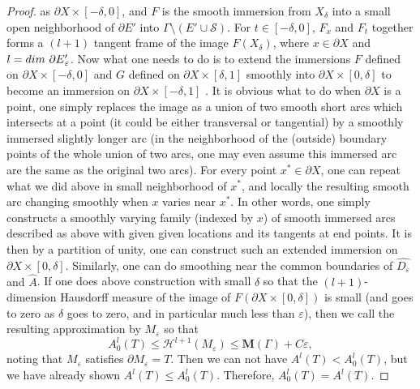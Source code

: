 \documentclass[10pt,a4paper]{amsart}
\begin{document}
\begin{proof}
as $\partial X \times [-\delta, 0]$, and  $F$ is the smooth immersion from $X_{\delta}$  into a small open neighborhood of
$\partial E'$ into $\Gamma \setminus (E'\cup \mathcal{S}).$  For $t \in [-\delta, 0]$, 
$F_{x}$  and $F_t$ together forms a $(l+1)$ tangent frame of the image $F(X_{\delta})$, where $x \in  \partial X$
and  $l = {\rm{dim}} \ \partial E{_\varepsilon'}$.  Now what one needs to do is to extend the immersions $F$ defined on  $\partial X \times [-\delta, 0]$ and $G$ defined on $\partial X \times [\delta, 1]$ smoothly into  $\partial X \times [0, \delta]$ to become an immersion on   $\partial X \times [-\delta, 1]$ .  It is obvious what to do when $\partial X $ is a point, one simply replaces the image as a union of two smooth short arcs which intersects at a point (it could be either transversal or tangential) by a smoothly immersed slightly longer arc (in the neighborhood of the (outside) boundary points of the whole union of two arcs, one may even assume this
immersed arc are the same as the original two arcs).  For every point $x^* \in  \partial X$, one can 
{repeat what we did above}  in small neighborhood of $x^*$, and locally the resulting smooth arc changing smoothly  
when $x$ varies near $x^*$. In other words, one simply constructs a smoothly varying family (indexed by $x$) of smooth immersed arcs described as above with given given locations and its tangents at end points.  It is then by a partition of unity, one can construct such an extended  immersion on  
$\partial X \times [0, \delta]$. Similarly, one can do  smoothing near the common boundaries of {$\widehat{D_\varepsilon}$ and $\widehat{A}$}. If one does above construction with small $\delta$ so that the $(l+1)$-dimension Hausdorff measure of the image of $F (\partial X \times [0, \delta])$ is small 
(and goes to zero as $\delta$ goes to zero, and in particular much less than $\varepsilon$), then
we call the resulting approximation by $M_\varepsilon$ so that
\[ A^l_0(T) \leq \mathcal{H}^{l+1}(M_\varepsilon) \leq \mathbf{M}(\Gamma) + C\varepsilon,\]
noting that $M_\varepsilon$ satisfies $\partial M_\varepsilon= T$.
Then we can not have $A^l(T) < A_0^l(T)$, but we {have already shown $A^l(T) \leq A_0^l(T)$. Therefore,} $A^l_0(T)=A^l(T).$
\end{proof}
\end{document}
